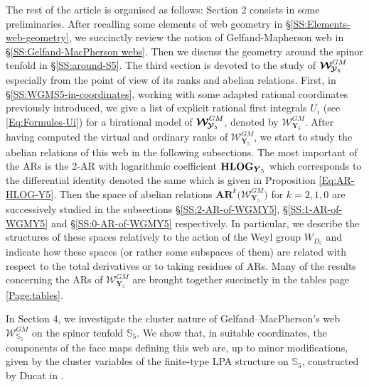 \documentclass[11pt]{amsart}
\begin{document}
The rest of the article is organised as follows:  Section 2 consists in some preliminaries. After recalling some elements of web geometry in \S\ref{SS:Elements-web-geometry}, we succinctly review  the notion 
of Gelfand-Mapherson web in \S\ref{SS:Gelfand-MacPherson webs}. Then we  discuss the geometry around the spinor tenfold in \S\ref{SS:around-S5}. The third section is devoted to the study of  $ \boldsymbol{\mathcal W}^{GM}_{ \hspace{-0.05cm}
\boldsymbol{\mathcal Y}_5}$ especially from the point of view of its ranks and abelian relations.  First, in \S\ref{SS:WGMS5-in-coordinates}, 
working with some adapted rational coordinates previously introduced, 
we give a list of explicit rational first integrals $U_i$ (see \eqref{Eq:Formules-Ui}) for a birational model of $ \boldsymbol{\mathcal W}^{GM}_{ \hspace{-0.05cm}\boldsymbol{\mathcal Y}_5}$, denoted by $ \boldsymbol{\mathcal W}^{GM}_{ \boldsymbol{Y}_5}$. 
After having computed the virtual and ordinary ranks of $ \boldsymbol{\mathcal W}^{GM}_{ \boldsymbol{Y}_5}$, we start to 
study the abelian relations of this web in the following subsections. 
The most important of the ARs is the 2-AR with logarithmic coefficient ${\bf HLOG}_{ \boldsymbol{Y}_5}$ which corresponds to the differential identity denoted the same which is given in Proposition \ref{Eq:AR-HLOG-Y5}.  Then the space of abelian relations $\boldsymbol{AR}^k\big( \boldsymbol{\mathcal W}^{GM}_{ \boldsymbol{Y}_5} \big)$ for $k=2,1,0$ 
are successively studied in the subsections 
\S\ref{SS:2-AR-of-WGMY5}, 
\S\ref{SS:1-AR-of-WGMY5} and 
\S\ref{SS:0-AR-of-WGMY5} respectively. In particular, we describe the structures of these spaces relatively to the action of the Weyl group $W_{D_5}$ and indicate how these spaces (or rather some subspaces of them) are related with respect to the total derivatives or to taking residues of ARs. Many of the results concerning the ARs of $ \boldsymbol{\mathcal W}^{GM}_{ \boldsymbol{Y}_5} $ are brought together succinctly in the tables page \ref{Page:tables}. 

 In Section 4, we investigate the cluster nature of Gelfand--MacPherson's web $ \boldsymbol{\mathcal W}^{GM}_{ {\mathbb S}_5} $ on the spinor tenfold ${\mathbb S}_5$. We show that, in suitable coordinates, the components of the face maps defining this web are, up to minor modifications, given by the cluster variables of the finite-type LPA structure on ${\mathbb S}_5$, constructed by Ducat in \cite{Ducat}.
 
\end{document}
